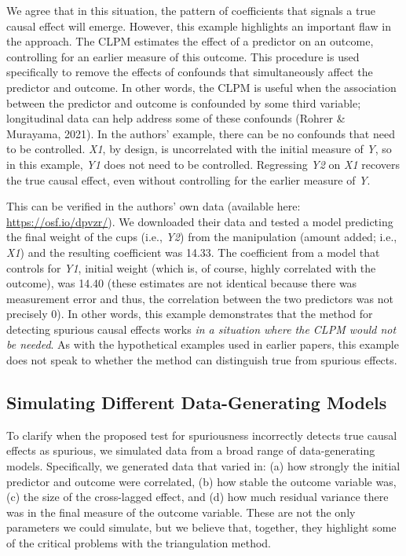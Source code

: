 \documentclass[
  man,mask,floatsintext]{apa6}
\begin{document}
We agree that in this situation, the pattern of coefficients that signals a true causal effect will emerge. However, this example highlights an important flaw in the approach. The CLPM estimates the effect of a predictor on an outcome, controlling for an earlier measure of this outcome. This procedure is used specifically to remove the effects of confounds that simultaneously affect the predictor and outcome. In other words, the CLPM is useful when the association between the predictor and outcome is confounded by some third variable; longitudinal data can help address some of these confounds (Rohrer \& Murayama, 2021). In the authors' example, there can be no confounds that need to be controlled. \emph{X1}, by design, is uncorrelated with the initial measure of \emph{Y}, so in this example, \emph{Y1} does not need to be controlled. Regressing \emph{Y2} on \emph{X1} recovers the true causal effect, even without controlling for the earlier measure of \emph{Y}.

This can be verified in the authors' own data (available here: \url{https://osf.io/dpvzr/}). We downloaded their data and tested a model predicting the final weight of the cups (i.e., \emph{Y2}) from the manipulation (amount added; i.e., \emph{X1}) and the resulting coefficient was 14.33. The coefficient from a model that controls for \emph{Y1}, initial weight (which is, of course, highly correlated with the outcome), was 14.40 (these estimates are not identical because there was measurement error and thus, the correlation between the two predictors was not precisely 0). In other words, this example demonstrates that the method for detecting spurious causal effects works \emph{in a situation where the CLPM would not be needed}. As with the hypothetical examples used in earlier papers, this example does not speak to whether the method can distinguish true from spurious effects.

\subsection{Simulating Different Data-Generating Models}\label{simulating-different-data-generating-models}

To clarify when the proposed test for spuriousness incorrectly detects true causal effects as spurious, we simulated data from a broad range of data-generating models. Specifically, we generated data that varied in: (a) how strongly the initial predictor and outcome were correlated, (b) how stable the outcome variable was, (c) the size of the cross-lagged effect, and (d) how much residual variance there was in the final measure of the outcome variable. These are not the only parameters we could simulate, but we believe that, together, they highlight some of the critical problems with the triangulation method.
\end{document}
